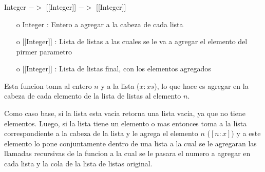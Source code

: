 \documentclass[10pt,journal]{IEEEtran}
\begin{document}
\subsubsection{\color{Red}{agregar}}
\begin{description}[style=nextline]
        \item[\color{Green}{Signatura}] Integer $->$ [[Integer]] $->$ [[Integer]]
        \begin{itemize} 
        \item [o]   Integer : Entero a agregar a la cabeza de cada lista
        \item [o] [[Integer]] : Lista de listas a las cuales se le va a agregar el elemento del pirmer parametro
        \item [o] [[Integer]] : Lista de listas final, con los elementos agregados
        \end{itemize}        
        
        \item[\color{Green}{Descripción}] Esta funcion toma al entero $n$ y a la lista ($x:xs$), lo que hace es agregar en la cabeza de cada elemento de la lista de listas al elemento $n$.
        
        Como caso base, si la lista esta vacia retorna una lista vacia, ya que no tiene elementos. Luego, si la lista tiene un elemento o mas entonces toma a la lista correspondiente a la cabeza de la lista y le agrega el elemento $n$ ($[n:x]$) y a este elemento lo pone conjuntamente dentro de una lista a la cual se le agregaran las llamadas recursivas de la funcion a la cual se le pasara el numero a agregar en cada lista y la cola de la lista de listas original.   
\end{description}
\end{document}
